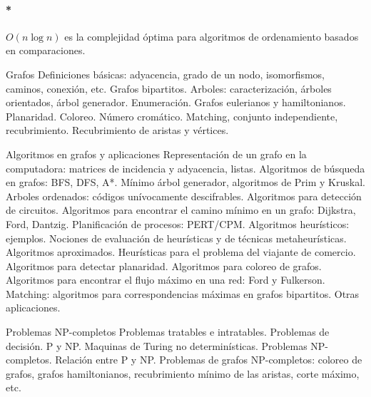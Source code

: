 \paragraph{*} \(O(n\log{n})\) es la complejidad óptima para algoritmos de ordenamiento basados en comparaciones. 

\color{red}

Grafos Definiciones básicas: adyacencia, grado de un nodo, isomorfismos, caminos, conexión, etc. Grafos bipartitos. Arboles: caracterización, árboles orientados, árbol generador. Enumeración. Grafos eulerianos y hamiltonianos. Planaridad. Coloreo. Número cromático. Matching, conjunto independiente, recubrimiento. Recubrimiento de aristas y vértices.



Algoritmos en grafos y aplicaciones Representación de un grafo en la computadora: matrices de incidencia y adyacencia, listas. Algoritmos de búsqueda en grafos: BFS, DFS, A*. Mínimo árbol generador, algoritmos de Prim y Kruskal. Arboles ordenados: códigos unívocamente descifrables. Algoritmos para detección de circuitos. Algoritmos para encontrar el camino mínimo en un grafo: Dijkstra, Ford, Dantzig. Planificación de procesos: PERT/CPM. Algoritmos heurísticos: ejemplos. Nociones de evaluación de heurísticas y de técnicas metaheurísticas. Algoritmos aproximados. Heurísticas para el problema del viajante de comercio. Algoritmos para detectar planaridad. Algoritmos para coloreo de grafos. Algoritmos para encontrar el flujo máximo en una red: Ford y Fulkerson. Matching: algoritmos para correspondencias máximas en grafos bipartitos. Otras aplicaciones.



Problemas NP-completos Problemas tratables e intratables. Problemas de decisión. P y NP. Maquinas de Turing no determinísticas. Problemas NP-completos. Relación entre P y NP. Problemas de grafos NP-completos: coloreo de grafos, grafos hamiltonianos, recubrimiento mínimo de las aristas, corte máximo, etc.


